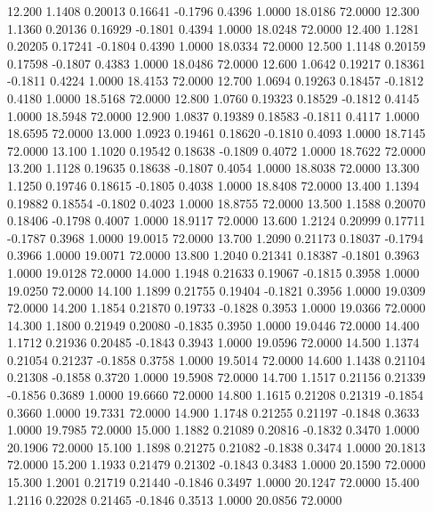   12.200   1.1408   0.20013   0.16641  -0.1796   0.4396   1.0000  18.0186  72.0000
  12.300   1.1360   0.20136   0.16929  -0.1801   0.4394   1.0000  18.0248  72.0000
  12.400   1.1281   0.20205   0.17241  -0.1804   0.4390   1.0000  18.0334  72.0000
  12.500   1.1148   0.20159   0.17598  -0.1807   0.4383   1.0000  18.0486  72.0000
  12.600   1.0642   0.19217   0.18361  -0.1811   0.4224   1.0000  18.4153  72.0000
  12.700   1.0694   0.19263   0.18457  -0.1812   0.4180   1.0000  18.5168  72.0000
  12.800   1.0760   0.19323   0.18529  -0.1812   0.4145   1.0000  18.5948  72.0000
  12.900   1.0837   0.19389   0.18583  -0.1811   0.4117   1.0000  18.6595  72.0000
  13.000   1.0923   0.19461   0.18620  -0.1810   0.4093   1.0000  18.7145  72.0000
  13.100   1.1020   0.19542   0.18638  -0.1809   0.4072   1.0000  18.7622  72.0000
  13.200   1.1128   0.19635   0.18638  -0.1807   0.4054   1.0000  18.8038  72.0000
  13.300   1.1250   0.19746   0.18615  -0.1805   0.4038   1.0000  18.8408  72.0000
  13.400   1.1394   0.19882   0.18554  -0.1802   0.4023   1.0000  18.8755  72.0000
  13.500   1.1588   0.20070   0.18406  -0.1798   0.4007   1.0000  18.9117  72.0000
  13.600   1.2124   0.20999   0.17711  -0.1787   0.3968   1.0000  19.0015  72.0000
  13.700   1.2090   0.21173   0.18037  -0.1794   0.3966   1.0000  19.0071  72.0000
  13.800   1.2040   0.21341   0.18387  -0.1801   0.3963   1.0000  19.0128  72.0000
  14.000   1.1948   0.21633   0.19067  -0.1815   0.3958   1.0000  19.0250  72.0000
  14.100   1.1899   0.21755   0.19404  -0.1821   0.3956   1.0000  19.0309  72.0000
  14.200   1.1854   0.21870   0.19733  -0.1828   0.3953   1.0000  19.0366  72.0000
  14.300   1.1800   0.21949   0.20080  -0.1835   0.3950   1.0000  19.0446  72.0000
  14.400   1.1712   0.21936   0.20485  -0.1843   0.3943   1.0000  19.0596  72.0000
  14.500   1.1374   0.21054   0.21237  -0.1858   0.3758   1.0000  19.5014  72.0000
  14.600   1.1438   0.21104   0.21308  -0.1858   0.3720   1.0000  19.5908  72.0000
  14.700   1.1517   0.21156   0.21339  -0.1856   0.3689   1.0000  19.6660  72.0000
  14.800   1.1615   0.21208   0.21319  -0.1854   0.3660   1.0000  19.7331  72.0000
  14.900   1.1748   0.21255   0.21197  -0.1848   0.3633   1.0000  19.7985  72.0000
  15.000   1.1882   0.21089   0.20816  -0.1832   0.3470   1.0000  20.1906  72.0000
  15.100   1.1898   0.21275   0.21082  -0.1838   0.3474   1.0000  20.1813  72.0000
  15.200   1.1933   0.21479   0.21302  -0.1843   0.3483   1.0000  20.1590  72.0000
  15.300   1.2001   0.21719   0.21440  -0.1846   0.3497   1.0000  20.1247  72.0000
  15.400   1.2116   0.22028   0.21465  -0.1846   0.3513   1.0000  20.0856  72.0000
